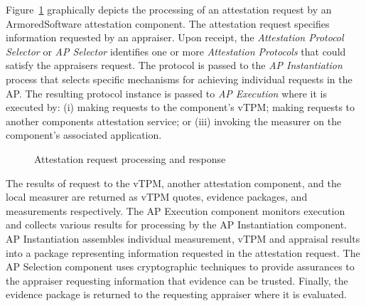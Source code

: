 \documentclass[10pt]{article}
\begin{document}
Figure~\ref{fig:attestation} graphically depicts the processing of an
attestation request by an ArmoredSoftware attestation component.  The
attestation request specifies information requested by an appraiser.
Upon receipt, the \emph{Attestation Protocol Selector} or \emph{AP
  Selector} identifies one or more \emph{Attestation Protocols} that
could satisfy the appraisers request.  The protocol is passed to the
\emph{AP Instantiation} process that selects specific mechanisms for
achieving individual requests in the AP.  The resulting protocol
instance is passed to \emph{AP Execution} where it is executed by: (i)
making requests to the component's vTPM; making requests to another
components attestation service; or (iii) invoking the measurer on the
component's associated application.

\begin{figure}
\centering 
{}
  \caption{Attestation request processing and response}
  \label{fig:attestation}
\end{figure}

The results of request to the vTPM, another attestation component, and
the local measurer are returned as vTPM quotes, evidence packages, and
measurements respectively.  The AP Execution component monitors
execution and collects various results for processing by the AP
Instantiation component.  AP Instantiation assembles individual
measurement, vTPM and appraisal results into a package representing
information requested in the attestation request.  The AP Selection
component uses cryptographic techniques to provide assurances to the
appraiser requesting information that evidence can be trusted.
Finally, the evidence package is returned to the requesting appraiser
where it is evaluated.
\end{document}
